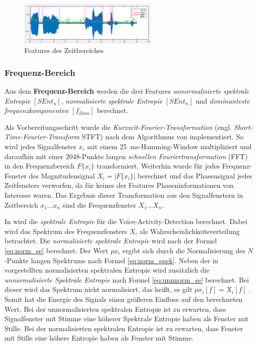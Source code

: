 \begin{figure}[h]
	\centering
	\includegraphics[width=0.6\textwidth]{bilder/VAD_TDsignals.png}
	\caption{Features des Zeitbereiches}
	\label{img:VAD_TDsignals}
\end{figure}


\subsubsection{Frequenz-Bereich}

Aus dem \textbf{Frequenz-Bereich} werden die drei Features \emph{unnormalisierte spektrale Entropie} $[SEnt_{u}]$, \emph{normalisierte spektrale Entropie}  $[SEnt_{n}]$ und \emph{dominanteste frequenzkomponenten} $[f_{Dom}]$ berechnet. 

Als Vorbereitungsschritt wurde die \emph{Kurzzeit-Fourier-Transformation} (engl. \emph{Short-Time-Fourier-Transform} STFT) nach dem Algorithmus von \cite{juliusSmith} implementiert. So wird jedes Signalfenster $x_i$ mit einem \SI{25}{\milli\second}-Hamming-Window multipliziert und daraufhin mit einer 2048-Punkte langen \emph{schnellen Fouriertransformation} (FFT) in den Frequenzbereich $F\{x_i\}$ transformiert. Weiterhin wurde für jedes Frequenz-Fenster des Magnitudensignal $X_i = |F\{x_i\}|$ berechnet und das Phasensignal jedes Zeitfensters verworfen, da für keines der Features Phaseninformationen von Interesse waren. Das Ergebnis dieser Transformation aus den Signalfenstern in Zeitbereich $x_1...x_n$ sind die Frequenzfenster $X_1...X_n$.

In \cite{vad_Lisboa} wird die \emph{spektrale Entropie} für die Voice-Activity-Detection berechnet. Dabei wird das Spektrum des Frequenzfensters $X_i$ als Wahrscheinlichkeitsverteilung betrachtet. Die \emph{normalisierte spektrale Entropie} wird nach der Formel \ref{eq:norm_se} berechnet. Der Wert $px_i$ ergibt sich durch die Normalisierung des $N$-Punkte langen Spektrums nach Formel \ref{eq:norm_spek}. Neben der in \cite{vad_Lisboa} vorgestellten normalisierten spektralen Entropie wird zusätzlich die \emph{unnormalisierte Spektrale Entropie} nach Formel \ref{eq:unnnorm_se} berechnet. Bei dieser wird das Spektrum nicht normalisiert, das heißt, es gilt $px_i[f] = X_i[f]$ . Somit hat die Energie des Signals einen größeren Einfluss auf den berechneten Wert. Bei der unnormalisierten spektralen Entropie ist zu erwarten, dass Signalfenster mit Stimme eine höherer Spektrale Entropie haben als Fenster mit Stille. Bei der normalisierten spektralen Entropie ist zu erwarten, dass Fenster mit Stille eine höhere Entropie haben als Fenster mit Stimme. 

